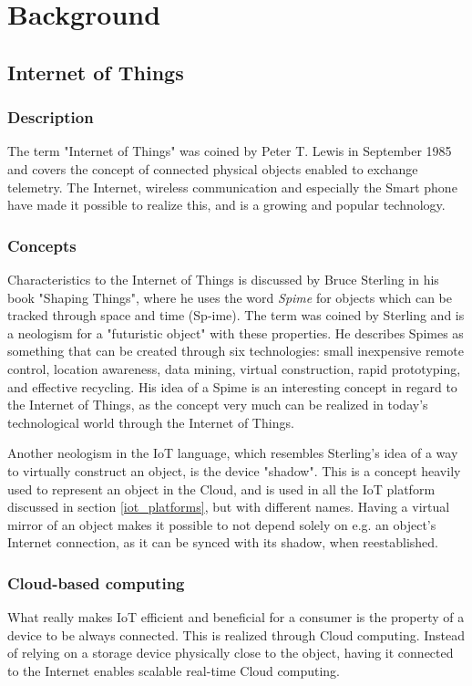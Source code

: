 \section{Background}
\label{background}

\subsection{Internet of Things}
\subsubsection{Description}
The term "Internet of Things" was coined by Peter T. Lewis in September 1985 and covers the concept of connected physical objects enabled to exchange telemetry. The Internet, wireless communication and especially the Smart phone have made it possible to realize this, and is a growing and popular technology. 

\subsubsection{Concepts}
Characteristics to the Internet of Things is discussed by Bruce Sterling in his book "Shaping Things"\cite{books:shaping-things}, where he uses the word \textit{Spime} for objects which can be tracked through space and time (Sp-ime). The term was coined by Sterling and is a neologism for a "futuristic object" with these properties. He describes Spimes as something that can be created through six technologies: small inexpensive remote control, location awareness, data mining, virtual construction, rapid prototyping, and effective recycling. His idea of a Spime is an interesting concept in regard to the Internet of Things, as the concept very much can be realized in today's technological world through the Internet of Things.

Another neologism in the IoT language, which resembles Sterling's idea of a way to virtually construct an object, is the device "shadow". This is a concept heavily used to represent an object in the Cloud, and is used in all the IoT platform discussed in section \ref{iot_platforms}, but with different names. Having a virtual mirror of an object makes it possible to not depend solely on e.g. an object's Internet connection, as it can be synced with its shadow, when reestablished. 

\subsubsection{Cloud-based computing}
What really makes IoT efficient and beneficial for a consumer is the property of a device to be always connected. This is realized through Cloud computing. Instead of relying on a storage device physically close to the object, having it connected to the Internet enables scalable real-time Cloud computing. 


